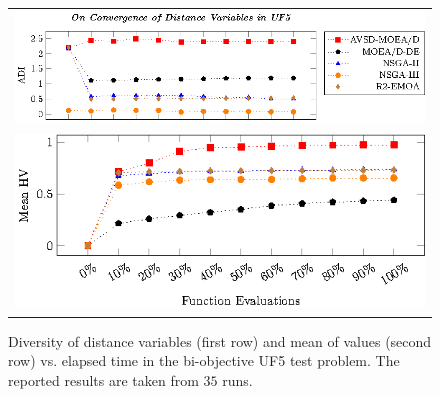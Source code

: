 \begin{figure}[t]
\centering
\begin{tabular}{l}
 \includegraphics[scale=0.75]{images/Diversity_Long_Term_tikz_UF5-figure0.eps}\\[0cm]%
 \includegraphics[scale=0.75]{images/Diversity_Long_Term_tikz_UF5-figure1.eps}\\[0cm]%
\end{tabular}
\caption{Diversity of distance variables (first row) and mean of \HV{} values (second row) vs. elapsed time in the bi-objective UF5 test problem. The reported results are taken from $35$ runs.}\label{fig:UF5_Diversity}
\end{figure}

